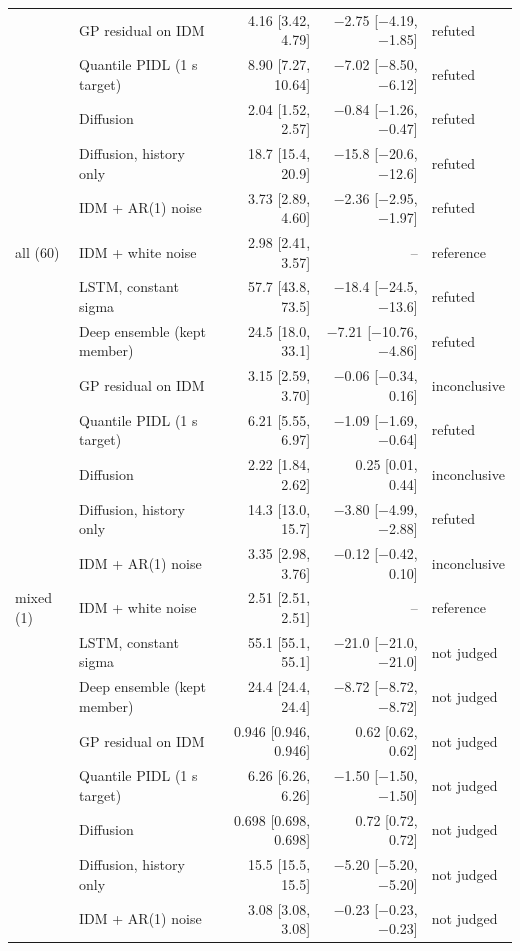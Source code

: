 \begin{table}[htbp]
\begin{tabular}{llrrl}
 & GP residual on IDM & 4.16 [3.42, 4.79] & $-$2.75 [$-$4.19, $-$1.85] & refuted \\
 & Quantile PIDL (1 s target) & 8.90 [7.27, 10.64] & $-$7.02 [$-$8.50, $-$6.12] & refuted \\
 & Diffusion & 2.04 [1.52, 2.57] & $-$0.84 [$-$1.26, $-$0.47] & refuted \\
 & Diffusion, history only & 18.7 [15.4, 20.9] & $-$15.8 [$-$20.6, $-$12.6] & refuted \\
 & IDM + AR(1) noise & 3.73 [2.89, 4.60] & $-$2.36 [$-$2.95, $-$1.97] & refuted \\
\midrule
all (60) & IDM + white noise & 2.98 [2.41, 3.57] & -- & reference \\
 & LSTM, constant sigma & 57.7 [43.8, 73.5] & $-$18.4 [$-$24.5, $-$13.6] & refuted \\
 & Deep ensemble (kept member) & 24.5 [18.0, 33.1] & $-$7.21 [$-$10.76, $-$4.86] & refuted \\
 & GP residual on IDM & 3.15 [2.59, 3.70] & $-$0.06 [$-$0.34, 0.16] & inconclusive \\
 & Quantile PIDL (1 s target) & 6.21 [5.55, 6.97] & $-$1.09 [$-$1.69, $-$0.64] & refuted \\
 & Diffusion & 2.22 [1.84, 2.62] & 0.25 [0.01, 0.44] & inconclusive \\
 & Diffusion, history only & 14.3 [13.0, 15.7] & $-$3.80 [$-$4.99, $-$2.88] & refuted \\
 & IDM + AR(1) noise & 3.35 [2.98, 3.76] & $-$0.12 [$-$0.42, 0.10] & inconclusive \\
\midrule
mixed (1) & IDM + white noise & 2.51 [2.51, 2.51] & -- & reference \\
 & LSTM, constant sigma & 55.1 [55.1, 55.1] & $-$21.0 [$-$21.0, $-$21.0] & not judged \\
 & Deep ensemble (kept member) & 24.4 [24.4, 24.4] & $-$8.72 [$-$8.72, $-$8.72] & not judged \\
 & GP residual on IDM & 0.946 [0.946, 0.946] & 0.62 [0.62, 0.62] & not judged \\
 & Quantile PIDL (1 s target) & 6.26 [6.26, 6.26] & $-$1.50 [$-$1.50, $-$1.50] & not judged \\
 & Diffusion & 0.698 [0.698, 0.698] & 0.72 [0.72, 0.72] & not judged \\
 & Diffusion, history only & 15.5 [15.5, 15.5] & $-$5.20 [$-$5.20, $-$5.20] & not judged \\
 & IDM + AR(1) noise & 3.08 [3.08, 3.08] & $-$0.23 [$-$0.23, $-$0.23] & not judged \\
\bottomrule
\end{tabular}
\end{table}
